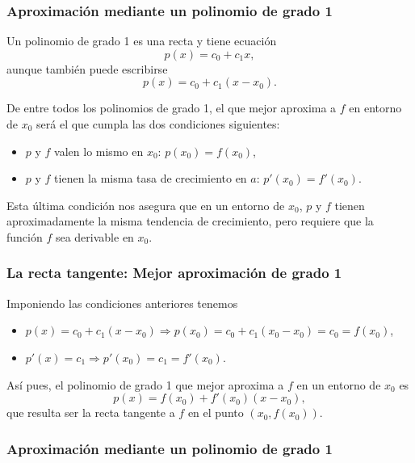 \begin{frame}
\frametitle{Aproximación mediante un polinomio de grado 1}
Un polinomio de grado 1 es una recta y tiene ecuación
\[
p(x) = c_0+c_1x,
\]
aunque también puede escribirse
\[
p(x) = c_0+c_1(x-x_0).
\]

De entre todos los polinomios de grado 1, el que mejor aproxima a $f$ en entorno de $x_0$ será el que cumpla las dos condiciones siguientes:
\begin{itemize}
\item[\structure{1-}] $p$ y $f$ valen lo mismo en $x_0$: $p(x_0) = f(x_0)$,
\item[\structure{2-}] $p$ y $f$ tienen la misma tasa de crecimiento en $a$: $p'(x_0) = f'(x_0)$.
\end{itemize}
Esta última condición nos asegura que en un entorno de $x_0$, $p$ y $f$ tienen aproximadamente la misma tendencia de crecimiento, pero requiere que la función $f$ sea derivable en $x_0$.
\end{frame}


\begin{frame}
\frametitle{La recta tangente: Mejor aproximación de grado 1}
Imponiendo las condiciones anteriores tenemos
\begin{itemize}
\item[\structure{1-}] $p(x)=c_0+c_1(x-x_0) \Rightarrow p(x_0)=c_0+c_1(x_0-x_0)=c_0=f(x_0)$,
\item[\structure{2-}] $p'(x)=c_1 \Rightarrow p'(x_0)=c_1=f'(x_0)$.
\end{itemize}

Así pues, el polinomio de grado 1 que mejor aproxima a $f$ en un entorno de $x_0$ es
\[
p(x) = f(x_0)+f '(x_0)(x-x_0),
\]
que resulta ser la recta tangente a $f$ en el punto $(x_0,f(x_0))$.
\end{frame}


\begin{frame}
\frametitle{Aproximación mediante un polinomio de grado 1}
\begin{center}
\scalebox{1}{}
\end{center}
\end{frame}


